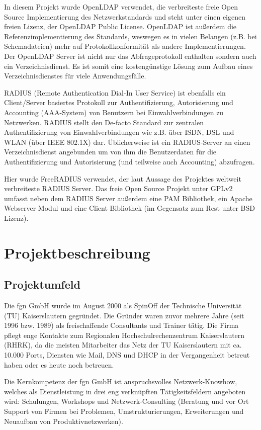 \documentclass[11pt,a4paper,titlepage=firstiscover]{scrartcl} %
\begin{document}
In diesem Projekt wurde OpenLDAP verwendet, die verbreiteste freie Open Source Implementierung des Netzwerkstandards und steht unter einen eigenen freien Lizenz, der OpenLDAP Public License. OpenLDAP ist außerdem die Referenzimplementierung des Standards, weswegen es in vielen Belangen (z.B. bei Schemadateien) mehr auf Protokollkonformität als andere Implementierungen. Der OpenLDAP Server ist nicht nur das Abfrageprotokoll enthalten sondern auch ein Verzeichnisdienst. Es ist somit eine kostengünstige Lösung zum Aufbau eines Verzeichnisdienstes für viele Anwendungsfälle.

RADIUS (Remote Authentication Dial-In User Service) ist ebenfalls ein Client/Server basiertes Protokoll zur Authentifizierung, Autorisierung und Accounting (AAA-System) von Benutzern bei Einwahlverbindungen zu Netzwerken. RADIUS stellt den De-facto Standard zur zentralen Authentifizierung von Einwahlverbindungen wie z.B. über ISDN, DSL und WLAN (über IEEE 802.1X) dar. Üblicherweise ist ein RADIUS-Server an einen Verzeichnisdienst angebunden um von ihm die Benutzerdaten für die Authentifizierung und Autorisierung (und teilweise auch Accounting) abzufragen.

Hier wurde FreeRADIUS verwendet, der laut Aussage des Projektes weltweit verbreiteste RADIUS Server. Das freie Open Source Projekt unter GPLv2 umfasst neben dem RADIUS Server außerdem eine PAM Bibliothek, ein Apache Webserver Modul und eine Client Bibliothek (im Gegensatz zum Rest unter BSD Lizenz).

\section{Projektbeschreibung}
\subsection{Projektumfeld}
Die fgn GmbH wurde im August 2000 als SpinOff der Technische Universität (TU) Kaiserslautern gegründet. Die Gründer waren zuvor mehrere Jahre (seit 1996 bzw. 1989) als freischaffende Consultants und Trainer tätig. Die Firma pflegt enge Kontakte zum Regionalen Hochschulrechenzentrum Kaiserslautern (RHRK), da die meisten Mitarbeiter das Netz der TU Kaiserslautern mit ca. 10.000 Ports, Diensten wie Mail, DNS und DHCP in der Vergangenheit betreut haben oder es heute noch betreuen.

Die Kernkompetenz der fgn GmbH ist anspruchsvolles Netzwerk-Knowhow, welches als Dienstleistung in drei eng verknüpften Tätigkeitsfeldern angeboten wird: Schulungen, Workshops und Netzwerk-Consulting (Beratung und vor Ort Support von Firmen bei Problemen, Umstrukturierungen, Erweiterungen und Neuaufbau von Produktivnetzwerken).
\end{document}
